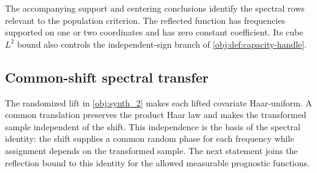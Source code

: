 The accompanying support and centering conclusions identify the spectral rows relevant to the population criterion. The reflected function has frequencies supported on one or two coordinates and has zero constant coefficient. Its cube \(L^2\) bound also controls the independent-sign branch of \cref{obj:def:capacity-handle}.

\subsection{Common-shift spectral transfer}

The randomized lift in \cref{obj:synth_2} makes each lifted covariate Haar-uniform. A common translation preserves the product Haar law and makes the transformed sample independent of the shift. This independence is the basis of the spectral identity: the shift supplies a common random phase for each frequency while assignment depends on the transformed sample. The next statement joins the reflection bound to this identity for the allowed measurable prognostic functions.

